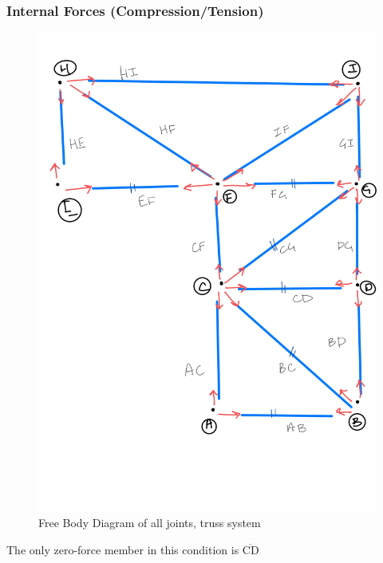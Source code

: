 \subsubsection{Internal Forces (Compression/Tension)}
\begin{figure}
\centering
\includegraphics[width=\textwidth]{con1_fbd.jpg}
\caption{Free Body Diagram of all joints, truss system}
\end{figure}
The only zero-force member in this condition is $ \overline{\mathrm{CD}}$
\centering
